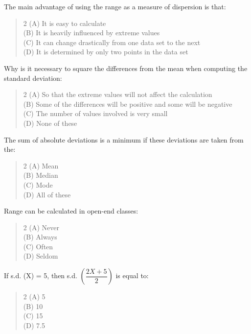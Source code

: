 \documentclass[11pt,a4paper]{article}
\begin{document}
\begin{mcqlist}
\item The main advantage of using the range as a measure of dispersion is that:
\begin{quote}\begin{multicols}{2}
\noindent (A) It is easy to calculate \\
(B) It is heavily influenced by extreme values \\
(C) It can change drastically from one data set to the next \\
(D) It is determined by only two points in the data set
\end{multicols}\end{quote}

\item Why is it necessary to square the differences from the mean when computing the standard deviation:
\begin{quote}\begin{multicols}{2}
\noindent (A) So that the extreme values will not affect the calculation \\
(B) Some of the differences will be positive and some will be negative \\
(C) The number of values involved is very small \\
(D) None of these
\end{multicols}\end{quote}

\item The sum of absolute deviations is a minimum if these deviations are taken from the:
\begin{quote}\begin{multicols}{2}
\noindent (A) Mean \\
(B) Median \\
(C) Mode \\
(D) All of these
\end{multicols}\end{quote}

\item Range can be calculated in open-end classes:
\begin{quote}\begin{multicols}{2}
\noindent (A) Never \\
(B) Always \\
(C) Often \\
(D) Seldom
\end{multicols}\end{quote}

\item If s.d. (X) = 5, then s.d. $\left(\dfrac{2X+5}{2}\right)$ is equal to:
\begin{quote}\begin{multicols}{2}
\noindent (A) 5 \\
(B) 10 \\
(C) 15 \\
(D) 7.5
\end{multicols}\end{quote}


\end{mcqlist}
\end{document}
